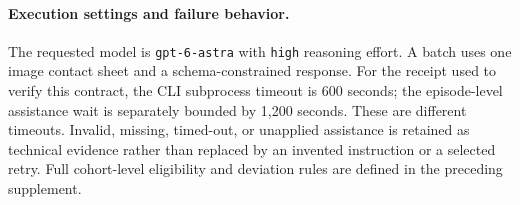 \paragraph{Execution settings and failure behavior.}
The requested model is \texttt{gpt-6-astra} with \texttt{high} reasoning effort. A batch uses one image contact sheet and a schema-constrained response. For the receipt used to verify this contract, the CLI subprocess timeout is 600 seconds; the episode-level assistance wait is separately bounded by 1,200 seconds. These are different timeouts. Invalid, missing, timed-out, or unapplied assistance is retained as technical evidence rather than replaced by an invented instruction or a selected retry. Full cohort-level eligibility and deviation rules are defined in the preceding supplement.
